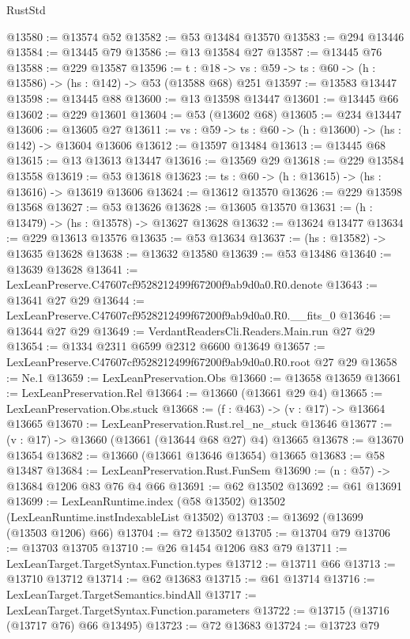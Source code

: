 \begin{lexlean}{RustStd}
\begin{coremodule}
@13580 := @13574 @52
@13582 := @53 @13484 @13570
@13583 := @294 @13446
@13584 := @13445 @79
@13586 := @13 @13584 @27
@13587 := @13445 @76
@13588 := @229 @13587
@13596 := {t : @18} ->
  {vs : @59} -> {ts : @60} -> (h : @13586) -> (hs : @142) -> @53 (@13588 @68) @251
@13597 := @13583 @13447
@13598 := @13445 @88
@13600 := @13 @13598 @13447
@13601 := @13445 @66
@13602 := @229 @13601
@13604 := @53 (@13602 @68)
@13605 := @234 @13447
@13606 := @13605 @27
@13611 := {vs : @59} -> {ts : @60} -> (h : @13600) -> (hs : @142) -> @13604 @13606
@13612 := @13597 @13484
@13613 := @13445 @68
@13615 := @13 @13613 @13447
@13616 := @13569 @29
@13618 := @229 @13584 @13558
@13619 := @53 @13618
@13623 := {ts : @60} -> (h : @13615) -> (hs : @13616) -> @13619 @13606
@13624 := @13612 @13570
@13626 := @229 @13598 @13568
@13627 := @53 @13626
@13628 := @13605 @13570
@13631 := (h : @13479) -> (hs : @13578) -> @13627 @13628
@13632 := @13624 @13477
@13634 := @229 @13613 @13576
@13635 := @53 @13634
@13637 := (hs : @13582) -> @13635 @13628
@13638 := @13632 @13580
@13639 := @53 @13486
@13640 := @13639 @13628
@13641 := LexLeanPreserve.C47607cf9528212499f67200f9ab9d0a0.R0.denote
@13643 := @13641 @27 @29
@13644 := LexLeanPreserve.C47607cf9528212499f67200f9ab9d0a0.R0.__fits_0
@13646 := @13644 @27 @29
@13649 := VerdantReadersCli.Readers.Main.run @27 @29
@13654 := @1334 @2311 @6599 @2312 @6600 @13649
@13657 := LexLeanPreserve.C47607cf9528212499f67200f9ab9d0a0.R0.root @27 @29
@13658 := Ne.{1}
@13659 := LexLeanPreservation.Obs
@13660 := @13658 @13659
@13661 := LexLeanPreservation.Rel
@13664 := @13660 (@13661 @29 @4)
@13665 := LexLeanPreservation.Obs.stuck
@13668 := (f : @463) -> (v : @17) -> @13664 @13665
@13670 := LexLeanPreservation.Rust.rel_ne_stuck @13646
@13677 := (v : @17) -> @13660 (@13661 (@13644 @68 @27) @4) @13665
@13678 := @13670 @13654
@13682 := @13660 (@13661 @13646 @13654) @13665
@13683 := @58 @13487
@13684 := LexLeanPreservation.Rust.FunSem
@13690 := (n : @57) -> @13684 @1206 @83 @76 @4 @66
@13691 := @62 @13502
@13692 := @61 @13691
@13699 := LexLeanRuntime.index (@58 @13502) @13502 (LexLeanRuntime.instIndexableList @13502)
@13703 := @13692 (@13699 (@13503 @1206) @66)
@13704 := @72 @13502
@13705 := @13704 @79
@13706 := @13703 @13705
@13710 := @26 @1454 @1206 @83 @79
@13711 := LexLeanTarget.TargetSyntax.Function.types
@13712 := @13711 @66
@13713 := @13710 @13712
@13714 := @62 @13683
@13715 := @61 @13714
@13716 := LexLeanTarget.TargetSemantics.bindAll
@13717 := LexLeanTarget.TargetSyntax.Function.parameters
@13722 := @13715 (@13716 (@13717 @76) @66 @13495)
@13723 := @72 @13683
@13724 := @13723 @79

\end{coremodule}
\end{lexlean}
